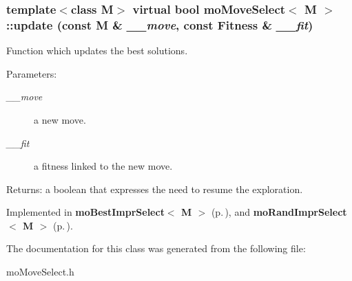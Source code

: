 \subsubsection{\setlength{\rightskip}{0pt plus 5cm}template$<$class M$>$ virtual bool {\bf mo\-Move\-Select}$<$ M $>$::update (const M \& {\em \_\-\_\-move}, const {\bf Fitness} \& {\em \_\-\_\-fit})\hspace{0.3cm}{\tt  [pure virtual]}}\label{classmo_move_select_7c157b6e64fd417acf6e900059204eb1}


Function which updates the best solutions. 

\begin{Desc}
\item[Parameters:]
\begin{description}
\item[{\em \_\-\_\-move}]a new move. \item[{\em \_\-\_\-fit}]a fitness linked to the new move. \end{description}
\end{Desc}
\begin{Desc}
\item[Returns:]a boolean that expresses the need to resume the exploration. \end{Desc}


Implemented in {\bf mo\-Best\-Impr\-Select$<$ M $>$} {\rm (p.\,\pageref{classmo_best_impr_select_d10e3e6f8a0277731e95ef506d064d6d})}, and {\bf mo\-Rand\-Impr\-Select$<$ M $>$} {\rm (p.\,\pageref{classmo_rand_impr_select_60ae5548560caee7e28d5ed2446186c9})}.

The documentation for this class was generated from the following file:\begin{CompactItemize}
\item 
mo\-Move\-Select.h\end{CompactItemize}
